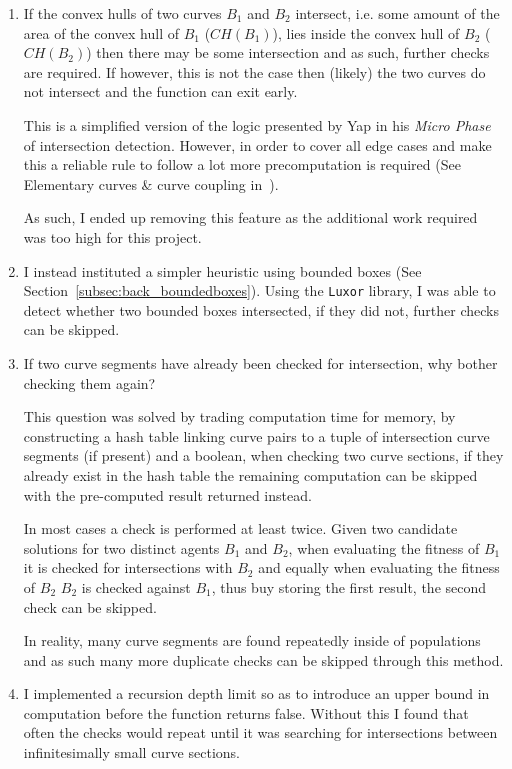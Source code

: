 \begin{enumerate}
  \item If the convex hulls of two curves $B_{1}$ and $B_{2}$ intersect, i.e. some amount of the area of the convex hull of $B_{1}$ ($CH(B_{1})$), lies inside the convex hull of $B_{2}$ ($CH(B_{2})$) then there may  be some intersection and as such, further checks are required. If however, this is not the case then (likely) the two curves do not intersect and the function can exit early.

        This is a simplified version of the logic presented by Yap in his \textit{Micro Phase} of intersection detection. However, in order to cover all edge cases and make this a reliable rule to follow a lot more precomputation is required (See Elementary curves \& curve coupling in~\cite{yapCompleteSubdivisionAlgorithms2006}).

        As such, I ended up removing this feature as the additional work required was too high for this project.
    \item I instead instituted a simpler heuristic using bounded boxes (See Section~\ref{subsec:back_boundedboxes}). Using the \texttt{Luxor} library\cite{JuliaGraphicsLuxorJl2021}, I was able to detect whether two bounded boxes intersected, if they did not, further checks can be skipped.
  \item If two curve segments have already been checked for intersection, why bother checking them again?

        This question was solved by trading computation time for memory, by constructing a hash table linking curve pairs to a tuple of intersection curve segments (if present) and a boolean, when checking two curve sections, if they already exist in the hash table the remaining computation can be skipped with the pre-computed result returned instead.

        In most cases a check is performed at least twice. Given two candidate solutions for two distinct agents $B_{1}$ and $B_{2}$, when evaluating the fitness of $B_{1}$ it is checked for intersections with $B_{2}$ and equally when evaluating the fitness of $B_{2}$ $B_{2}$ is checked against $B_{1}$, thus buy storing the first result, the second check can be skipped.

        In reality, many curve segments are found repeatedly inside of populations and as such many more duplicate checks can be skipped through this method.
  \item I implemented a recursion depth limit so as to introduce an upper bound in computation before the function returns false. Without this I found that often the checks would repeat until it was searching for intersections between infinitesimally small curve sections.


\end{enumerate}
